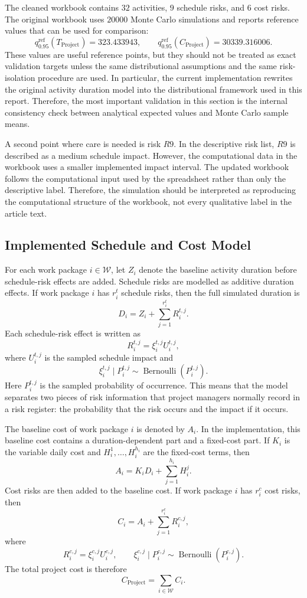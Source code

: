 \documentclass[11pt,a4paper]{article}
\newcommand{\cW}{\mathcal{W}}
\newcommand{\1}{\mathbf{1}}
\newcommand{\given}{\mid}
\theoremstyle{definition}
\theoremstyle{plain}
\theoremstyle{remark}
\numberwithin{equation}{section}
\begin{document}
The cleaned workbook contains $32$ activities, $9$ schedule risks, and $6$ cost risks. The original workbook uses $20000$ Monte Carlo simulations and reports reference values that can be used for comparison:
\[
q_{0.95}^{\mathrm{ref}}(T_{\text{Project}})=323.433943,
\qquad
q_{0.95}^{\mathrm{ref}}(C_{\text{Project}})=30339.316006.
\]
These values are useful reference points, but they should not be treated as exact validation targets unless the same distributional assumptions and the same risk-isolation procedure are used. In particular, the current implementation rewrites the original activity duration model into the distributional framework used in this report. Therefore, the most important validation in this section is the internal consistency check between analytical expected values and Monte Carlo sample means.

A second point where care is needed is risk $R9$. In the descriptive risk list, $R9$ is described as a medium schedule impact. However, the computational data in the workbook uses a smaller implemented impact interval. The updated workbook follows the computational input used by the spreadsheet rather than only the descriptive label. Therefore, the simulation should be interpreted as reproducing the computational structure of the workbook, not every qualitative label in the article text.

\subsection{Implemented Schedule and Cost Model}

For each work package $i\in\cW$, let $Z_i$ denote the baseline activity duration before schedule-risk effects are added. Schedule risks are modelled as additive duration effects. If work package $i$ has $r_i^t$ schedule risks, then the full simulated duration is
\[
D_i
=
Z_i+\sum_{j=1}^{r_i^t}R_i^{t,j}.
\]
Each schedule-risk effect is written as
\[
R_i^{t,j}
=
\xi_i^{t,j}U_i^{t,j},
\]
where $U_i^{t,j}$ is the sampled schedule impact and
\[
\xi_i^{t,j}\given P_i^{t,j}
\sim
\operatorname{Bernoulli}(P_i^{t,j}).
\]
Here $P_i^{t,j}$ is the sampled probability of occurrence. This means that the model separates two pieces of risk information that project managers normally record in a risk register: the probability that the risk occurs and the impact if it occurs.

The baseline cost of work package $i$ is denoted by $A_i$. In the implementation, this baseline cost contains a duration-dependent part and a fixed-cost part. If $K_i$ is the variable daily cost and $H_i^1,\ldots,H_i^{h_i}$ are the fixed-cost terms, then
\[
A_i
=
K_iD_i+\sum_{j=1}^{h_i}H_i^j.
\]
Cost risks are then added to the baseline cost. If work package $i$ has $r_i^c$ cost risks, then
\[
C_i
=
A_i+\sum_{j=1}^{r_i^c}R_i^{c,j},
\]
where
\[
R_i^{c,j}
=
\xi_i^{c,j}U_i^{c,j},
\qquad
\xi_i^{c,j}\given P_i^{c,j}
\sim
\operatorname{Bernoulli}(P_i^{c,j}).
\]
The total project cost is therefore
\[
C_{\text{Project}}
=
\sum_{i\in\cW}C_i.
\]
\end{document}
